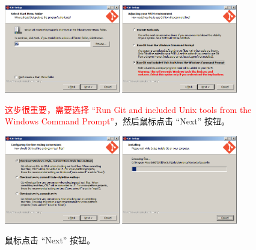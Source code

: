 \documentclass{article}
\begin{document}
\begin{figure}[ht]\centering
  \includegraphics[width=0.45\textwidth]{figures/git/set9-5.png}
  \includegraphics[width=0.45\textwidth]{figures/git/set9-6.png}
  \caption{\textcolor{red}{这步很重要，需要选择 ``Run Git and included Unix tools from the Windows Command Prompt''}，然后鼠标点击 ``Next'' 按钮。}\label{fig:set9-5}
\end{figure}



\begin{figure}[ht]\centering
  \includegraphics[width=0.45\textwidth]{figures/git/set9-7.png}
  \includegraphics[width=0.45\textwidth]{figures/git/set9-8.png}
  \caption{鼠标点击 ``Next'' 按钮。}\label{fig:set9-7}
\end{figure}
\end{document}
